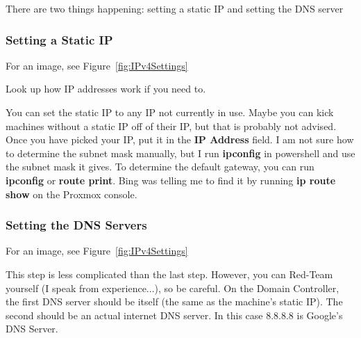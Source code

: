 \documentclass{article}
\begin{document}
There are two things happening: setting a static IP and setting the DNS server

\subsubsection{Setting a Static IP}
For an image, see Figure~\ref{fig:IPv4Settings}

\noindent Look up how IP addresses work if you need to.

You can set the static IP to any IP not currently in use.
Maybe you can kick machines without a static IP off of their IP, but that is probably not advised.
Once you have picked your IP, put it in the \textbf{IP Address} field.
I am not sure how to determine the subnet mask manually, but I run \textbf{ipconfig} in powershell
and use the subnet mask it gives.
To determine the default gateway, you can run \textbf{ipconfig} or \textbf{route print}.
Bing was telling me to find it by running \textbf{ip route show} on the Proxmox console.


\subsubsection{Setting the DNS Servers}
For an image, see Figure~\ref{fig:IPv4Settings}

This step is less complicated than the last step. However, you can Red-Team yourself (I speak from experience...), so be careful.
On the Domain Controller, the first DNS server should be itself (the same as the machine's static IP). The second should be an actual internet DNS server.
In this case 8.8.8.8 is Google's DNS Server.
\end{document}

